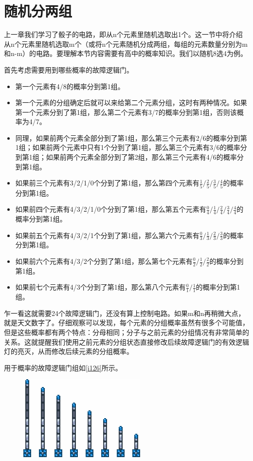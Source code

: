 \section{随机分两组}\label{sec36}

上一章我们学习了骰子的电路，即从n个元素里随机选取出1个。这一节中将介绍从n个元素里随机选取m个（或将n个元素随机分成两组，每组的元素数量分别为m和n-m）的电路。要理解本节内容需要有高中的概率知识。我们以随机8选4为例。

首先考虑需要用到哪些概率的故障逻辑门。
\begin{itemize}
\item 第一个元素有4/8的概率分到第1组。
\item 第一个元素的分组确定后就可以来给第二个元素分组，这时有两种情况。如果第一个元素分到了第1组，那么第二个元素有3/7的概率分到第1组，否则该概率为4/7。
\item 同理，如果前两个元素全部分到了第1组，那么第三个元素有2/6的概率分到第1组；如果前两个元素中只有1个分到了第1组，那么第三个元素有3/6的概率分到第1组；如果前两个元素全部分到了第2组，那么第三个元素有4/6的概率分到第1组。
\item 如果前三个元素有3/2/1/0个分到了第1组，那么第四个元素有$\frac{1}{5}/\frac{2}{5}/\frac{3}{5}/\frac{4}{5}$的概率分到第1组。
\item 如果前四个元素有4/3/2/1/0个分到了第1组，那么第五个元素有$\frac{0}{4}/\frac{1}{4}/\frac{2}{4}/\frac{3}{4}/\frac{4}{4}$的概率分到第1组。
\item 如果前五个元素有4/3/2/1个分到了第1组，那么第六个元素有$\frac{0}{3}/\frac{1}{3}/\frac{2}{3}/\frac{3}{3}$的概率分到第1组。
\item 如果前六个元素有4/3/2个分到了第1组，那么第七个元素有$\frac{0}{2}/\frac{1}{2}/\frac{2}{2}$的概率分到第1组。
\item 如果前七个元素有4/3个分到了第1组，那么第八个元素有$\frac{0}{1}/\frac{1}{1}$的概率分到第1组。
\end{itemize}

乍一看这就需要24个故障逻辑门，还没有算上控制电路。如果m和n再稍微大点，就是天文数字了。仔细观察可以发现，每个元素的分组概率虽然有很多个可能值，但是这些概率都有两个特点：分母相同；分子与之前元素的分组情况有非常简单的关系。这就提醒我们使用之前元素的分组状态直接修改后续故障逻辑门的有效逻辑灯的亮灭，从而修改后续元素的分组概率。

用于概率的故障逻辑门组如\autoref{i126}所示。

\begin{figure}[!ht]
\centering
\includegraphics{images/126.png}
\caption{}
\label{i126}
\end{figure}

